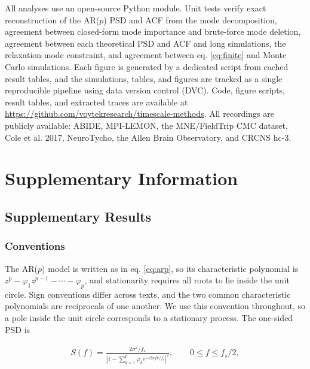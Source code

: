 \documentclass[pdflatex,lineno,sn-nature]{sn-jnl}
\theoremstyle{thmstyleone}
\theoremstyle{thmstyletwo}
\theoremstyle{thmstylethree}
\begin{document}
All analyses use an open-source Python module. Unit tests verify exact reconstruction of the AR($p$) PSD and ACF from the mode decomposition, agreement between closed-form mode importance and brute-force mode deletion, agreement between each theoretical PSD and ACF and long simulations, the relaxation-mode constraint, and agreement between eq. \ref{eq:finite} and Monte Carlo simulations. Each figure is generated by a dedicated script from cached result tables, and the simulations, tables, and figures are tracked as a single reproducible pipeline using data version control (DVC). Code, figure scripts, result tables, and extracted traces are available at \href{https://github.com/voytekresearch/timescale-methods}{https://github.com/voytekresearch/timescale-methods}. All recordings are publicly available: ABIDE, MPI-LEMON, the MNE/FieldTrip CMC dataset, Cole et al. 2017, NeuroTycho, the Allen Brain Observatory, and CRCNS hc-3.

\backmatter

\clearpage
\section*{Supplementary Information}\label{sec:supp}

\setcounter{figure}{0}
\renewcommand{\thefigure}{S\arabic{figure}}
\setcounter{table}{0}
\renewcommand{\thetable}{S\arabic{table}}
\setcounter{equation}{0}
\renewcommand{\theequation}{S\arabic{equation}}

\subsection*{Supplementary Results}\label{sec:sresults}

\subsubsection*{Conventions}

The AR($p$) model is written as in eq. \ref{eq:arp}, so its characteristic polynomial is $z^p - \varphi_1 z^{p-1} - \cdots - \varphi_p$, and stationarity requires all roots to lie inside the unit circle. Sign conventions differ across texts, and the two common characteristic polynomials are reciprocals of one another. We use this convention throughout, so a pole inside the unit circle corresponds to a stationary process. The one-sided PSD is

\begin{align}
S(f) = \frac{2\sigma^2/f_s}{\left|1 - \sum_{k=1}^{p}\varphi_k e^{-i 2\pi f k/f_s}\right|^{2}}, \qquad 0 \le f \le f_s/2,
\end{align}
\end{document}
